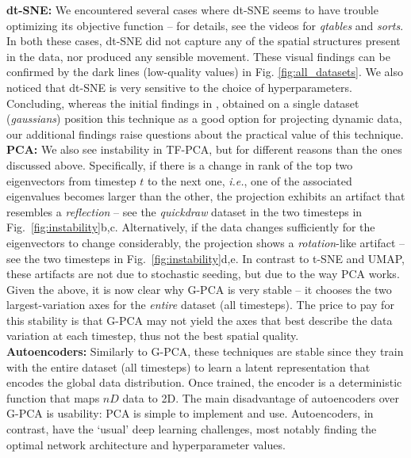 \noindent\textbf{dt-SNE:} We encountered several cases where dt-SNE seems to have trouble optimizing its objective function -- for details, see the videos for \textit{qtables} and \textit{sorts}. In both these cases, dt-SNE did not capture any of the spatial structures present in the data, nor produced any sensible movement. These visual findings can be confirmed by the dark lines (low-quality values) in Fig. \ref{fig:all_datasets}. We also noticed that dt-SNE is very sensitive to the choice of hyperparameters. Concluding, whereas the initial findings in \cite{Rauber2016}, obtained on a single dataset (\emph{gaussians}) position this technique as a good option for projecting dynamic data, our additional findings raise questions about the practical value of this technique.\\

\noindent\textbf{PCA:} We also see instability in TF-PCA, but for different reasons than the ones discussed above. Specifically, if there is a change in rank of the top two eigenvectors from timestep $t$ to the next one, \emph{i.e.}, one of the associated eigenvalues becomes larger than the other, the projection exhibits an artifact that resembles a \emph{reflection} -- see the \emph{quickdraw} dataset in the two timesteps in Fig.~\ref{fig:instability}b,c. Alternatively, if the data changes sufficiently for the eigenvectors to change considerably, the projection shows a \emph{rotation}-like artifact -- see the two timesteps in Fig.~\ref{fig:instability}d,e. In contrast to t-SNE and UMAP, these artifacts are not due to stochastic seeding, but due to the way PCA works. Given the above, it is now clear why G-PCA is very stable -- it chooses the two largest-variation axes for the \emph{entire} dataset (all timesteps). The price to pay for this stability is that G-PCA may not yield the axes that best describe the data variation at each timestep, thus not the best spatial quality.\\

\noindent\textbf{Autoencoders:} Similarly to G-PCA, these techniques are stable since they train with the entire dataset (all timesteps) to learn a latent representation that encodes the global data distribution. Once trained, the encoder is a deterministic function that maps $nD$ data to 2D. The main disadvantage of autoencoders over G-PCA is usability: PCA is simple to implement and use. Autoencoders, in contrast, have the `usual' deep learning challenges, most notably finding the optimal network architecture and hyperparameter values.

